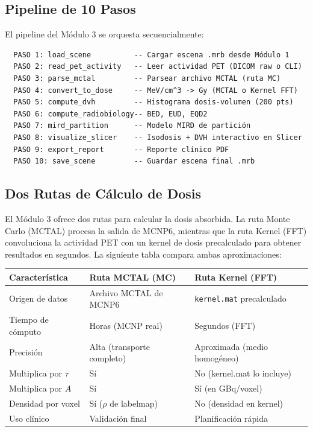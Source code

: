 \documentclass[12pt,a4paper]{article}
\begin{document}
\subsection{Pipeline de 10 Pasos}

El pipeline del Módulo 3 se orquesta secuencialmente:

\begin{lstlisting}
  PASO 1: load_scene          -- Cargar escena .mrb desde Módulo 1
  PASO 2: read_pet_activity   -- Leer actividad PET (DICOM raw o CLI)
  PASO 3: parse_mctal         -- Parsear archivo MCTAL (ruta MC)
  PASO 4: convert_to_dose     -- MeV/cm^3 -> Gy (MCTAL o Kernel FFT)
  PASO 5: compute_dvh         -- Histograma dosis-volumen (200 pts)
  PASO 6: compute_radiobiology-- BED, EUD, EQD2
  PASO 7: mird_partition      -- Modelo MIRD de partición
  PASO 8: visualize_slicer    -- Isodosis + DVH interactivo en Slicer
  PASO 9: export_report       -- Reporte clínico PDF
  PASO 10: save_scene         -- Guardar escena final .mrb
\end{lstlisting}

\subsection{Dos Rutas de Cálculo de Dosis}

El Módulo 3 ofrece dos rutas para calcular la dosis absorbida. La ruta Monte Carlo (MCTAL) procesa la salida de MCNP6, mientras que la ruta Kernel (FFT) convoluciona la actividad PET con un kernel de dosis precalculado para obtener resultados en segundos. La siguiente tabla compara ambas aproximaciones:

\begin{tabular}{p{4cm} p{5cm} p{5cm}}
\toprule
\textbf{Característica} & \textbf{Ruta MCTAL (MC)} & \textbf{Ruta Kernel (FFT)} \\
\midrule
Origen de datos & Archivo MCTAL de MCNP6 & \texttt{kernel.mat} precalculado \\
Tiempo de cómputo & Horas (MCNP real) & Segundos (FFT) \\
Precisión & Alta (transporte completo) & Aproximada (medio homogéneo) \\
Multiplica por $\tau$ & Sí & No (kernel.mat lo incluye) \\
Multiplica por $A$ & Sí & Sí (en GBq/voxel) \\
Densidad por voxel & Sí ($\rho$ de labelmap) & No (densidad en kernel) \\
Uso clínico & Validación final & Planificación rápida \\
\bottomrule
\end{tabular}
\end{document}
